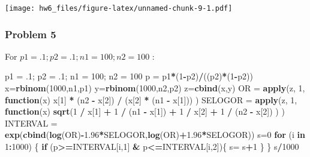 \documentclass[]{article}
\newenvironment{Shaded}{\begin{snugshade}}{\end{snugshade}}
\newcommand{\KeywordTok}[1]{\textcolor[rgb]{0.13,0.29,0.53}{\textbf{#1}}}
\newcommand{\DecValTok}[1]{\textcolor[rgb]{0.00,0.00,0.81}{#1}}
\newcommand{\FloatTok}[1]{\textcolor[rgb]{0.00,0.00,0.81}{#1}}
\newcommand{\StringTok}[1]{\textcolor[rgb]{0.31,0.60,0.02}{#1}}
\newcommand{\ControlFlowTok}[1]{\textcolor[rgb]{0.13,0.29,0.53}{\textbf{#1}}}
\newcommand{\OperatorTok}[1]{\textcolor[rgb]{0.81,0.36,0.00}{\textbf{#1}}}
\newcommand{\NormalTok}[1]{#1}
\begin{document}
\texttt{[image: hw6\_files/figure-latex/unnamed-chunk-9-1.pdf]}

\subsubsection{Problem 5}\label{problem-5}

For \(p1 = .1; p2 = .1; n1 = 100; n2 = 100\) :

\begin{Shaded}
\begin{Highlighting}[]
\NormalTok{p1 =}\StringTok{ }\NormalTok{.}\DecValTok{1}\NormalTok{; p2 =}\StringTok{ }\NormalTok{.}\DecValTok{1}\NormalTok{; n1 =}\StringTok{ }\DecValTok{100}\NormalTok{; n2 =}\StringTok{ }\DecValTok{100} 
\NormalTok{p =}\StringTok{ }\NormalTok{p1}\OperatorTok{*}\NormalTok{(}\DecValTok{1}\OperatorTok{-}\NormalTok{p2)}\OperatorTok{/}\NormalTok{((p2)}\OperatorTok{*}\NormalTok{(}\DecValTok{1}\OperatorTok{-}\NormalTok{p2))}
\NormalTok{x=}\KeywordTok{rbinom}\NormalTok{(}\DecValTok{1000}\NormalTok{,n1,p1)}
\NormalTok{y=}\KeywordTok{rbinom}\NormalTok{(}\DecValTok{1000}\NormalTok{,n2,p2)}
\NormalTok{z=}\KeywordTok{cbind}\NormalTok{(x,y)}
\NormalTok{OR =}\StringTok{ }\KeywordTok{apply}\NormalTok{(z, }\DecValTok{1}\NormalTok{, }\ControlFlowTok{function}\NormalTok{(x) x[}\DecValTok{1}\NormalTok{] }\OperatorTok{*}\StringTok{ }\NormalTok{(n2 }\OperatorTok{-}\StringTok{ }\NormalTok{x[}\DecValTok{2}\NormalTok{]) }\OperatorTok{/}\StringTok{ }\NormalTok{(x[}\DecValTok{2}\NormalTok{] }\OperatorTok{*}\StringTok{ }\NormalTok{(n1 }\OperatorTok{-}\StringTok{ }\NormalTok{x[}\DecValTok{1}\NormalTok{])) )}
\NormalTok{SELOGOR =}\StringTok{ }\KeywordTok{apply}\NormalTok{(z, }\DecValTok{1}\NormalTok{, }\ControlFlowTok{function}\NormalTok{(x) }\KeywordTok{sqrt}\NormalTok{(}\DecValTok{1} \OperatorTok{/}\StringTok{ }\NormalTok{x[}\DecValTok{1}\NormalTok{] }\OperatorTok{+}\StringTok{ }\DecValTok{1} \OperatorTok{/}\StringTok{ }\NormalTok{(n1 }\OperatorTok{-}\StringTok{ }\NormalTok{x[}\DecValTok{1}\NormalTok{]) }\OperatorTok{+}\StringTok{ }\DecValTok{1} \OperatorTok{/}\StringTok{ }\NormalTok{x[}\DecValTok{2}\NormalTok{] }\OperatorTok{+}\StringTok{ }\DecValTok{1} \OperatorTok{/}\StringTok{ }\NormalTok{(n2 }\OperatorTok{-}\StringTok{ }\NormalTok{x[}\DecValTok{2}\NormalTok{]) ) )}
\NormalTok{INTERVAL =}\StringTok{ }\KeywordTok{exp}\NormalTok{(}\KeywordTok{cbind}\NormalTok{(}\KeywordTok{log}\NormalTok{(OR)}\OperatorTok{-}\FloatTok{1.96}\OperatorTok{*}\NormalTok{SELOGOR,}\KeywordTok{log}\NormalTok{(OR)}\OperatorTok{+}\FloatTok{1.96}\OperatorTok{*}\NormalTok{SELOGOR))}
\NormalTok{s=}\DecValTok{0}
\ControlFlowTok{for}\NormalTok{ (i }\ControlFlowTok{in} \DecValTok{1}\OperatorTok{:}\DecValTok{1000}\NormalTok{) \{}
  \ControlFlowTok{if}\NormalTok{ (p}\OperatorTok{>=}\NormalTok{INTERVAL[i,}\DecValTok{1}\NormalTok{] }\OperatorTok{&}\StringTok{ }\NormalTok{p}\OperatorTok{<=}\NormalTok{INTERVAL[i,}\DecValTok{2}\NormalTok{])\{}
\NormalTok{    s=}\StringTok{ }\NormalTok{s}\OperatorTok{+}\DecValTok{1}
\NormalTok{  \}}
\NormalTok{\}}
\NormalTok{s}\OperatorTok{/}\DecValTok{1000}
\end{Highlighting}
\end{Shaded}
\end{document}
